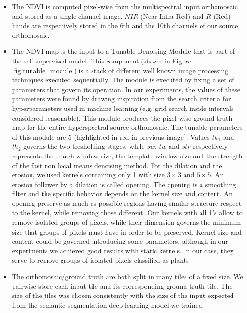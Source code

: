 \documentclass[comsoc,final]{IEEEtran}
\newcommand{\todo}[1]{\textcolor{red}{#1}}
\begin{document}
\begin{itemize}
    \item The NDVI is computed pixel-wise from the multispectral input orthomosaic and stored as a single-channel image. 
    $NIR$ (Near Infra Red) and $R$ (Red) bands are respectively stored in the 6th and the 10th channels of our source orthomosaic.
    \item The NDVI map is the input to a Tunable Denoising Module that is part of the self-supervised model. This component (shown in Figure \ref{fig:tunable_module}) is a stack of different well known image processing techniques executed sequentially. 
    The module is executed by fixing a set of parameters that govern its operation. In our experiments, the values of these parameters were found by drawing inspiration from the search criteria for hyperparameters used in machine learning (e.g. grid search inside intervals considered reasonable).
    This module produces the pixel-wise ground truth map for the entire hyperspectral source orthomosaic. The tunable parameters of this module are 5 (highlighted in red in previous image). Values $th_1$ and $th_2$ governs the two tresholding stages, while $sw$, $tw$ and $str$ respectively represents the search window size, the template window size and the strength of the fast non local means denoising method. For the dilation and the erosion, we used kernels containing only 1 with size $3\times3$ and $5\times5$.
    An erosion follower by a dilation is called opening. The opening is a smoothing filter and the specific behavior depends on the kernel size and content. An opening preserve as much as possible regions having similar structure respect to the kernel, while removing those different. Our kernels with all 1's allow to remove isolated groups of pixels, while their dimension governs the minimum size that groups of pixels must have in order to be preserved. Kernel size and content could be governed introducing some parameters, although in our experiments we achieved good results with static kernels.
In our case, they serve to remove groups of isolated pixels classified as plants 
    \item The orthomosaic/ground truth are both split in many tiles of a fixed size. We pairwise store each input tile and its corresponding ground truth tile. The size of the tiles was chosen consistently with the size of the input expected from the semantic segmentation deep learning model we trained.
\end{itemize}
\end{document}
